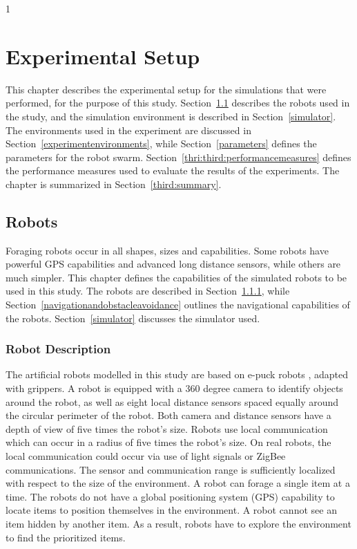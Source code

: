 
1\chapter{Experimental Setup}
\label{chap:third}


This chapter describes the experimental setup for the simulations that were performed, for the purpose of this study. Section~\ref{chap:robots} describes the robots used in the study, and the simulation environment is described in Section~\ref{simulator}. The environments used in the experiment are discussed in Section~\ref{experimentenvironments}, while Section~\ref{parameters} defines the parameters for the robot swarm. Section~\ref{thri:third:performancemeasures} defines the performance measures used to evaluate the results of the experiments. The chapter is summarized in Section~\ref{third:summary}.


\section{Robots}
\label{chap:robots}

Foraging robots occur in all shapes, sizes and capabilities. Some robots have powerful GPS capabilities and advanced long distance sensors, while others are much simpler. This chapter defines the capabilities of the simulated robots to be used in this study. The robots are described in Section~\ref{robotdescription}, while Section~\ref{navigationandobstacleavoidance} outlines the navigational capabilities of the robots. Section~\ref{simulator} discusses the simulator used.

\subsection{Robot Description}
\label{robotdescription}

The artificial robots modelled in this study are based on e-puck robots \cite{mondada2009puck}, adapted with grippers. A robot is equipped with a 360 degree camera to identify objects around the robot, as well as eight local distance sensors spaced equally around the circular perimeter of the robot. Both camera and distance sensors have a depth of view of five times the robot's size. Robots use local communication which can occur in a radius of five times the robot's size. On real robots, the local communication could occur via use of light signals or ZigBee communications. The sensor and communication range is sufficiently localized with respect to the size of the environment. A robot can forage a single item at a time. The robots do not have a global positioning system (GPS) capability to locate items to position themselves in the environment. A robot cannot see an item hidden by another item. As a result, robots have to explore the environment to find the prioritized items.

